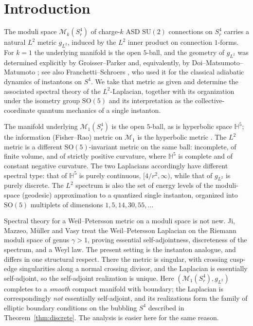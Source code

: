 \documentclass[11pt,letterpaper]{article}
\newcommand{\bbH}{\mathbb{H}}
\newcommand{\cM}{\mathcal{M}}
\newcommand{\SO}{\mathrm{SO}}
\theoremstyle{plain}
\theoremstyle{remark}
\begin{document}
\section{Introduction}\label{sec:intro}

The moduli space $\cM_k(S^4_r)$ of charge-$k$ ASD $\mathrm{SU}(2)$ connections on $S^4_r$ carries a natural $L^2$ metric $g_{L^2}$, induced by the $L^2$ inner product on connection $1$-forms. For $k=1$ the underlying manifold is the open $5$-ball, and the geometry of $g_{L^2}$ was determined explicitly by Groisser--Parker \cite{GP1987} and, equivalently, by Doi--Matsumoto--Matumoto \cite{DMM1987}; see also Franchetti--Schroers \cite{FS2016}, who used it for the classical adiabatic dynamics of instantons on $S^4$. We take that metric as given and determine the associated spectral theory of the $L^2$-Laplacian, together with its organization under the isometry group $\SO(5)$ and its interpretation as the collective-coordinate quantum mechanics of a single instanton.

The manifold underlying $\cM_1(S^4_r)$ is the open $5$-ball, as is hyperbolic space $\bbH^5$; the information (Fisher--Rao) metric on $\cM_1$ is the hyperbolic metric \cite{Info}. The $L^2$ metric is a different $\SO(5)$-invariant metric on the same ball: incomplete, of finite volume, and of strictly positive curvature, where $\bbH^5$ is complete and of constant negative curvature. The two Laplacians accordingly have different spectral type: that of $\bbH^5$ is purely continuous, $[4/r^2,\infty)$, while that of $g_{L^2}$ is purely discrete. The $L^2$ spectrum is also the set of energy levels of the moduli-space (geodesic) approximation to a quantized single instanton, organized into $\SO(5)$ multiplets of dimensions $1,5,14,30,55,\dots$

Spectral theory for a Weil--Petersson metric on a moduli space is not new. Ji, Mazzeo, M\"uller and Vasy \cite{JMMV} treat the Weil--Petersson Laplacian on the Riemann moduli space of genus $\gamma>1$, proving essential self-adjointness, discreteness of the spectrum, and a Weyl law. The present setting is the instanton analogue, and differs in one structural respect. There the metric is singular, with crossing cusp-edge singularities along a normal crossing divisor, and the Laplacian is essentially self-adjoint, so the self-adjoint realization is unique. Here $(\cM_1(S^4_r),g_{L^2})$ completes to a \emph{smooth} compact manifold with boundary; the Laplacian is correspondingly \emph{not} essentially self-adjoint, and its realizations form the family of elliptic boundary conditions on the bubbling $S^4$ described in Theorem~\ref{thm:discrete}. The analysis is easier here for the same reason.
\end{document}
